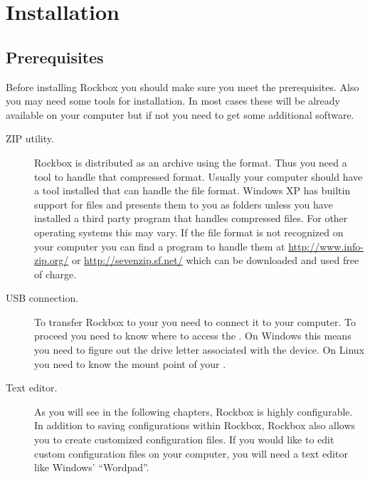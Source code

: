\chapter{Installation}\label{sec:installation}

\section{Prerequisites}\label{sec:prerequisites}

Before installing Rockbox you should make sure you meet the prerequisites.
Also you may need some tools for installation. In most cases these will be
already available on your computer but if not you need to get some additional
software.

\begin{description}
  
\item[ZIP utility.]   Rockbox is distributed as an archive using the 
   format. Thus you need a tool to handle that compressed 
  format. Usually your computer should have a tool installed that can 
  handle the  file format. Windows XP has builtin support for 
   files and presents them to you as folders unless you have 
  installed a third party program that handles compressed files. For
  other operating systems this may vary. If the  file format 
  is not recognized on your computer you can find a program to handle them 
  at \url{http://www.info-zip.org/} or \url{http://sevenzip.sf.net/} which 
  can be downloaded and used free of charge.
  
\item[USB connection.]  To transfer Rockbox to your \dap{} you need to 
  connect it to your computer. To proceed you need to know where to access the 
  \dap{}. On Windows this means you need to figure out the drive letter 
  associated with the device. On Linux you need to know the mount point of 
  your \dap{}.
  

\item[Text editor.]  As you will see in the following chapters, Rockbox is 
  highly configurable. In addition to saving configurations within Rockbox, 
  Rockbox also allows you to create customized configuration files. If you 
  would like to edit custom configuration files on your computer, you will 
  need a text editor like Windows' ``Wordpad''.

\end{description}


